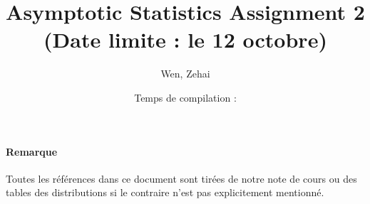 \documentclass[../main.tex]{subfiles}
\title{Asymptotic Statistics Assignment 2 \\ (Date limite : le 12 octobre)}
\author{Wen, Zehai }
\date{Temps de compilation : \DTMnow}
\begin{document}
\maketitle

\paragraph{Remarque}
Toutes les références dans ce document sont tirées de notre note de cours ou 
des tables des distributions si le contraire n'est pas explicitement mentionné.



\end{document}
